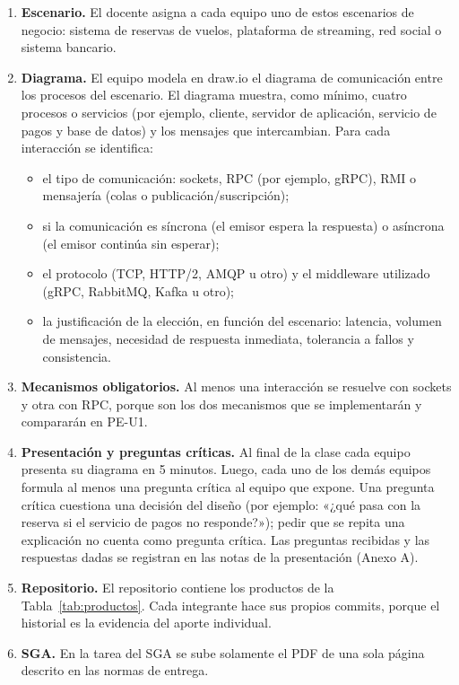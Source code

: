 \documentclass[11pt]{article}
\begin{document}
\begin{enumerate}[leftmargin=20pt,itemsep=4pt]
	\item \textbf{Escenario.} El docente asigna a cada equipo uno de estos escenarios de negocio: sistema de reservas de vuelos, plataforma de streaming, red social o sistema bancario.
	\item \textbf{Diagrama.} El equipo modela en draw.io el diagrama de comunicación entre los procesos del escenario. El diagrama muestra, como mínimo, cuatro procesos o servicios (por ejemplo, cliente, servidor de aplicación, servicio de pagos y base de datos) y los mensajes que intercambian. Para cada interacción se identifica:
	\begin{itemize}[itemsep=2pt]
		\item el tipo de comunicación: sockets, RPC (por ejemplo, gRPC), RMI o mensajería (colas o publicación/suscripción);
		\item si la comunicación es síncrona (el emisor espera la respuesta) o asíncrona (el emisor continúa sin esperar);
		\item el protocolo (TCP, HTTP/2, AMQP u otro) y el middleware utilizado (gRPC, RabbitMQ, Kafka u otro);
		\item la justificación de la elección, en función del escenario: latencia, volumen de mensajes, necesidad de respuesta inmediata, tolerancia a fallos y consistencia.
	\end{itemize}
	\item \textbf{Mecanismos obligatorios.} Al menos una interacción se resuelve con sockets y otra con RPC, porque son los dos mecanismos que se implementarán y compararán en PE-U1.
	\item \textbf{Presentación y preguntas críticas.} Al final de la clase cada equipo presenta su diagrama en 5 minutos. Luego, cada uno de los demás equipos formula al menos una pregunta crítica al equipo que expone. Una pregunta crítica cuestiona una decisión del diseño (por ejemplo: «¿qué pasa con la reserva si el servicio de pagos no responde?»); pedir que se repita una explicación no cuenta como pregunta crítica. Las preguntas recibidas y las respuestas dadas se registran en las notas de la presentación (Anexo A).
	\item \textbf{Repositorio.} El repositorio contiene los productos de la Tabla~\ref{tab:productos}. Cada integrante hace sus propios commits, porque el historial es la evidencia del aporte individual.
	\item \textbf{SGA.} En la tarea del SGA se sube solamente el PDF de una sola página descrito en las normas de entrega.
\end{enumerate}
\end{document}
